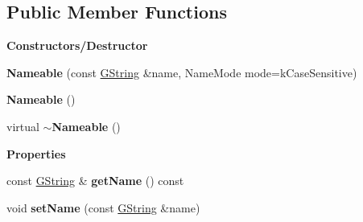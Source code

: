 \subsection*{Public Member Functions}
\begin{Indent}\textbf{ Constructors/\+Destructor}\par
\begin{DoxyCompactItemize}
\item 
\mbox{\label{classrev_1_1_nameable_a90491f9781e874c368c94b1ebe767d84}} 
{\bfseries Nameable} (const \mbox{\hyperlink{classrev_1_1_g_string}{G\+String}} \&name, Name\+Mode mode=k\+Case\+Sensitive)
\item 
\mbox{\label{classrev_1_1_nameable_acf43141de64e41f1b34c300ec217a768}} 
{\bfseries Nameable} ()
\item 
\mbox{\label{classrev_1_1_nameable_a957430cc8cf617034128984fb01ad56b}} 
virtual {\bfseries $\sim$\+Nameable} ()
\end{DoxyCompactItemize}
\end{Indent}
\begin{Indent}\textbf{ Properties}\par
\begin{DoxyCompactItemize}
\item 
\mbox{\label{classrev_1_1_nameable_a3d2c92ed8205a50a2738b221ac4d9cf3}} 
const \mbox{\hyperlink{classrev_1_1_g_string}{G\+String}} \& {\bfseries get\+Name} () const
\item 
\mbox{\label{classrev_1_1_nameable_a0921a68462b11bd783f410e0b40d4a0f}} 
void {\bfseries set\+Name} (const \mbox{\hyperlink{classrev_1_1_g_string}{G\+String}} \&name)
\end{DoxyCompactItemize}
\end{Indent}
